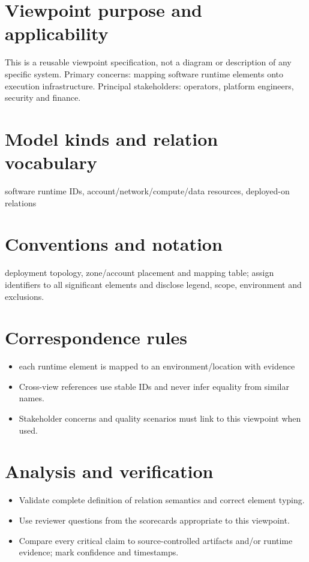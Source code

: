 \documentclass[10pt,letterpaper]{article}
\begin{document}
\DocProvenance
\section{Viewpoint purpose and applicability}
This is a reusable viewpoint specification, not a diagram or description of any specific system. Primary concerns: mapping software runtime elements onto execution infrastructure. Principal stakeholders: operators, platform engineers, security and finance.

\section{Model kinds and relation vocabulary}
software runtime IDs, account/network/compute/data resources, deployed-on relations

\section{Conventions and notation}
deployment topology, zone/account placement and mapping table; assign identifiers to all significant elements and disclose legend, scope, environment and exclusions.

\section{Correspondence rules}
\begin{itemize}
\item each runtime element is mapped to an environment/location with evidence
\item Cross-view references use stable IDs and never infer equality from similar names.
\item Stakeholder concerns and quality scenarios must link to this viewpoint when used.
\end{itemize}
\section{Analysis and verification}
\begin{itemize}
\item Validate complete definition of relation semantics and correct element typing.
\item Use reviewer questions from the scorecards appropriate to this viewpoint.
\item Compare every critical claim to source-controlled artifacts and/or runtime evidence; mark confidence and timestamps.
\end{itemize}
\end{document}
